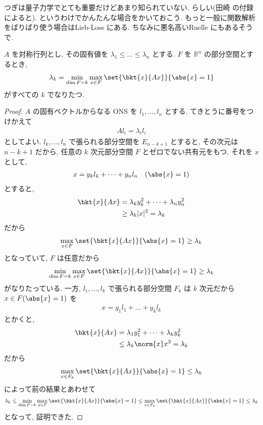 \documentclass[openany, a4paper, oneside]{jsbook}
\begin{document}
つぎは量子力学でとても重要だけどあまり知られていない.
らしい(田崎 \cite{HalTasaki3}の付録によると).
というわけでかんたんな場合をかいておこう.
もっと一般に関数解析をばりばり使う場合はLieb-Loss \cite{LiebLoss1}にある.
ちなみに悪名高いRuelle \cite{DavidRuelle1}にもあるそうで.
\begin{thm}
 $A$ を対称行列とし, その固有値を $\lambda_1 \le \dots \le \lambda_n$
 とする.
 $F$ を $\mathbb{R}^n$ の部分空間とするとき,
 \begin{align}
  \lambda_k
  =
  \min_{\dim F=k} \max_{x \in F} \set{\bkt{x}{Ax}}{\abs{x} = 1}
 \end{align}
 がすべての $k$ でなりたつ.
\end{thm}
\begin{proof}
$A$ の固有ベクトルからなる ONS を $l_1, \dots , l_n$ とする.
てきとうに番号をつけかえて
\begin{align}
 Al_i
 =
 \lambda_i l_i
\end{align}
としてよい.
$l_k, \dots , l_n$ で張られる部分空間を $E_{n-k+1}$ とすると,
その次元は $n-k+1$ だから, 任意の $k$ 次元部分空間 $F$ とゼロでない共有元をもつ.
それを $x$ として,
\begin{align}
 x
 =
 y_k l_k + \dots + y_n l_n \quad (\abs{x} = 1)
\end{align}
とすると,
\begin{align}
 \bkt{x}{Ax}
 &=
 \lambda_k y_k^2 + \dots + \lambda_n y_n^2 \\
 &\ge
 \lambda_k |x|^2
 =
 \lambda_k
\end{align}
だから
\begin{align}
 \max_{x\in F } \set{\bkt{x}{Ax}}{\abs{x} = 1}
 \ge
 \lambda_k
\end{align}
となっていて, $F$ は任意だから
\begin{align}
 \min_{\dim F=k} \max_{x\in F} \set{\bkt{x}{Ax}}{\abs{x} = 1}
 \ge
 \lambda_k
\end{align}
がなりたっている.
一方, $l_1, \dots , l_k$ で張られる部分空間 $F_k$ は $k$ 次元だから $x \in F (\abs{x} = 1)$ を
\begin{align}
 x
 =
 y_1 l_1 + \dots + y_k l_k
\end{align}
とかくと,
\begin{align}
 \bkt{x}{Ax}
 &=
 \lambda_1 y_1^2 + \dots + \lambda_k y_k^2  \\
 &\le
 \lambda_k \norm{x}x^2
 =
 \lambda_k
\end{align}
だから
\begin{align}
 \max_{x \in F_k} \set{\bkt{x}{Ax}}{\abs{x} = 1}
 \le
 \lambda_k
\end{align}
によって前の結果とあわせて
\begin{align}
 \lambda_k
 \le
 \min_{\dim F=k} \max_{x \in F} \set{\bkt{x}{Ax}}{\abs{x} = 1}
 \le
 \max_{x \in F_k } \set{\bkt{x}{Ax}}{\abs{x} = 1}
 \le
 \lambda_k
\end{align}
となって, 証明できた.
\end{proof}
\end{document}
